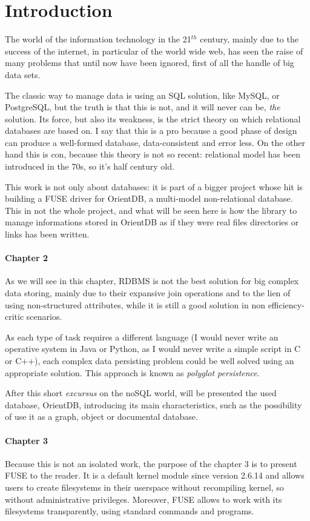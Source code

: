 \chapter{Introduction}
The world of the information technology in the 21$^{th}$ century, mainly due to the success of the internet, in particular of the world wide web, has seen the raise of many problems that until now have been ignored, first of all the handle of big data sets.

The classic way to manage data is using an SQL solution, like MySQL, or PostgreSQL, but the truth is that this is not, and it will never can be, \emph{the} solution. Its force, but also its weakness, is the strict theory on which relational databases are based on. I say that this is a pro because a good phase of design can produce a well-formed database, data-consistent and error less. On the other hand this is con, because this theory is not so recent: relational model has been introduced in the 70s, so it's half century old.

This work is not only about databases: it is part of a bigger project whose hit is building a FUSE driver for OrientDB, a multi-model non-relational database.
This in not the whole project, and what will be seen here is how the library to manage informations stored in OrientDB as if they were real files directories or links has been written.

\subsubsection{Chapter 2}
As we will see in this chapter, RDBMS is not the best solution for big complex data storing, mainly due to their expansive join operations and to the lien of using non-structured attributes, while it is still a good solution in non efficiency-critic scenarios.

As each type of task requires a different language (I would never write an operative system in Java or Python, as I would never write a simple script in C or C++), each complex data persisting problem could be well solved using an appropriate solution. This approach is known as \emph{polyglot persistence}.

After this short \emph{excursus} on the noSQL world, will be presented the used database, OrientDB, introducing its main characteristics, such as the possibility of use it as a graph, object or documental database.

\subsubsection{Chapter 3}
Because this is not an isolated work, the purpose of the chapter 3 is to present FUSE to the reader. It is a default kernel module since version 2.6.14 and allows users to create filesystems in their userspace without recompiling kernel, so without administrative privileges. Moreover, FUSE allows to work with its filesystems transparently, using standard commands and programs.

